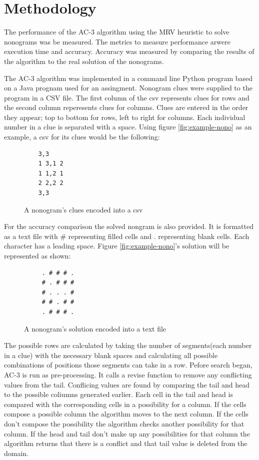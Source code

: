 \documentclass[12pt, letterpaper]
{article}
\begin{document}
\section{Methodology}
The performance of the AC-3 algorithm using the MRV heuristic to solve nonograms was be measured. The metrics to measure performance arwere execution time and accuracy. Accuracy was measured by comparing the results of the algorithm to the real solution of the nonograms.

The AC-3 algorithm was implemented in a command line Python program based on a Java prognam used for an assingment. Nonogram clues were supplied to the program in a CSV file. The first column of the csv represents clues for rows and the second column reperesents clues for columns. Clues are entered in the order they appear; top to bottom for rows, left to right for columns. Each individual number in a clue is separated with a space. Using figure \ref{fig:example-nono} as an example, a csv for its clues would be the following:
\begin{figure}[H]
    \caption{A nonogram's clues encoded into a csv}
    \begin{lstlisting}
    3,3
    1 3,1 2
    1 1,2 1
    2 2,2 2
    3,3
    \end{lstlisting}
\end{figure}
For the accuracy comparison the solved nongram is also provided. It is formatted as a text file with \# representing filled cells and . representing blank cells. Each character has a leading space. Figure \ref{fig:example-nono}'s solution will be represented as shown:

\begin{figure}[H]
    \caption{A nonogram's solution encoded into a text file}
    \begin{lstlisting}
     . # # # .
     # . # # #
     # . . . #
     # # . # #
     . # # # .
    \end{lstlisting}
\end{figure}

% 

The possible rows are calculated by taking the number of segments(each number in a clue) with the necessary blank spaces and calculating all possible combinations of positions those segments can take in a row. Pefore search began, AC-3 is run as pre-processing. It calls a revise function to remove any conflicting values from the tail. Conflicing values are found by comparing the tail and head to the possible coliumns generated earlier. Each cell in the tail and head is compared with the corresponding cells in a possibility for a column. If the cells compose a possible column the algorithm moves to the next column. If the cells don't compose the possibility the algorithm checks another possibility for that column. If the head and tail don't make up any possibilities for that column the algorithm returns that there is a conflict and that tail value is deleted from the domain.
\end{document}

